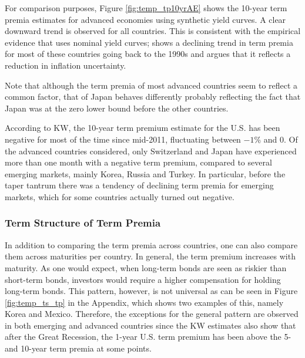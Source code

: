 {For comparison purposes, Figure \ref{fig:temp_tp10yrAE} shows the 10-year term premia estimates for advanced economies using synthetic yield curves. A clear downward trend is observed for all countries. This is consistent with the empirical evidence that uses nominal yield curves; \cite{Wright:2011} shows a declining trend in term premia for most of these countries going back to the 1990s and argues that it reflects a reduction in inflation uncertainty.
	

Note that although the term premia of most advanced countries seem to reflect a common factor, that of Japan behaves differently probably reflecting the fact that Japan was at the zero lower bound before the other countries.

According to KW, the 10-year term premium estimate for the U.S. has been negative for most of the time since mid-2011, fluctuating between $-1$\% and $0$. Of the advanced countries considered, only Switzerland and Japan have experienced more than one month with a negative term premium, compared to several emerging markets, mainly Korea, Russia and Turkey. In particular, before the taper tantrum there was a tendency of declining term premia for emerging markets, which for some countries actually turned out negative.

\subsubsection{Term Structure of Term Premia}
In addition to comparing the term premia across countries, one can also compare them across maturities per country. In general, the term premium increases with maturity. As one would expect, when long-term bonds are seen as riskier than short-term bonds, investors would require a higher compensation for holding long-term bonds. This pattern, however, is not universal as can be seen in Figure \ref{fig:temp_ts_tp} in the Appendix, which shows two examples of this, namely Korea and Mexico. Therefore, the exceptions for the general pattern are observed in both emerging and advanced countries since the KW estimates also show that after the Great Recession, the 1-year U.S. term premium has been above the 5- and 10-year term premia at some points.
%	

}
